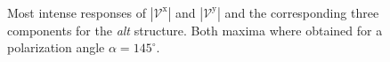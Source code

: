 \documentclass[prb,11pt,tightenlines,twocolumn,aps]{revtex4-1}
\begin{document}
\begin{figure}[tb]
    \centering
    \\
    \caption{Most intense responses of $|\mathcal{V}^{\mathrm{x}}|$ and
    $|\mathcal{V}^{\mathrm{y}}|$ and the corresponding three components for the
    \emph{alt} structure. Both maxima where obtained for a polarization
    angle $\alpha=145^{\circ}$. }
    \label{fig:alt-vab-comp-rtp}
\end{figure}
\end{document}
